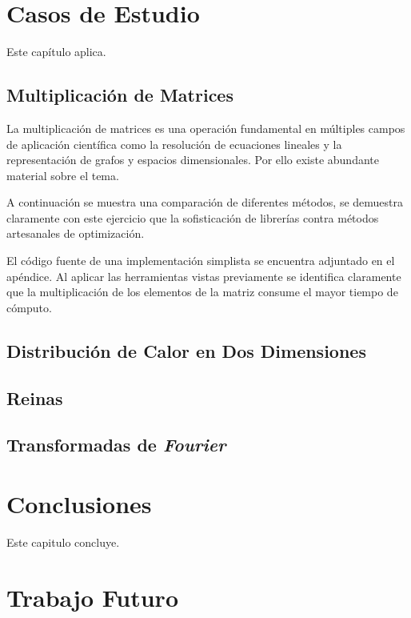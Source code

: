 \documentclass[a4paper]{report}
\begin{document}
\chapter{Casos de Estudio}

Este cap\'itulo aplica.

\section{Multiplicaci\'on de Matrices}

La multiplicaci\'on de matrices es una operaci\'on fundamental en m\'ultiples campos
de aplicaci\'on cient\'ifica como la resoluci\'on de ecuaciones lineales y la
representaci\'on de grafos y espacios dimensionales. Por ello existe abundante
 material sobre el tema.

\bigskip

A continuaci\'on se muestra una comparaci\'on de diferentes m\'etodos, se demuestra
claramente con este ejercicio que la sofisticaci\'on de librer\'ias contra
m\'etodos artesanales de optimizaci\'on.

\bigskip

El c\'odigo fuente de una implementaci\'on simplista se encuentra adjuntado en el
ap\'endice. Al aplicar las herramientas vistas previamente se identifica claramente
que la multiplicaci\'on de los elementos de la matriz consume el mayor tiempo de
c\'omputo.

\section{Distribuci\'on de Calor en Dos Dimensiones}

\section{Reinas}

\section{Transformadas de {\it Fourier}}

\chapter{Conclusiones}

Este capitulo concluye.

\chapter{Trabajo Futuro}
\end{document}
